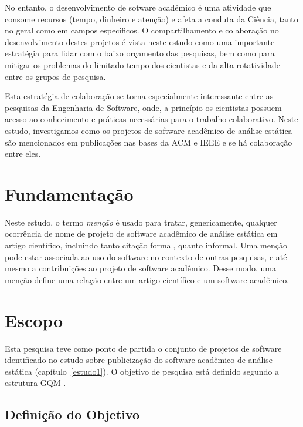 No entanto, o desenvolvimento de sotware acadêmico é uma atividade que consome recursos
(tempo, dinheiro e atenção) e afeta a conduta da Ciência, tanto no geral como
em campos específicos.
O compartilhamento e colaboração no desenvolvimento destes projetos é vista
neste estudo como uma importante estratégia para lidar com o baixo orçamento
das pesquisas, bem como para mitigar os problemas do limitado tempo dos
cientistas e da alta rotatividade entre os grupos de pesquisa.

Esta estratégia de colaboração se torna especialmente interessante entre as
pesquisas da Engenharia de Software, onde, a princípio os cientistas possuem
acesso ao conhecimento e práticas necessárias para o trabalho colaborativo.
Neste estudo, investigamos como os projetos de software acadêmico
de análise estática são mencionados em publicações nas bases da ACM e IEEE e se
há colaboração entre eles.


\section{Fundamentação} \label{estudo2:fundamentacao}

Neste estudo,
o termo \textit{menção} é usado para tratar, genericamente, qualquer ocorrência de
nome de projeto de software acadêmico de análise estática em artigo científico,
incluindo tanto citação formal, quanto informal.
Uma menção pode estar associada ao uso do software no contexto de outras pesquisas,
e até mesmo a contribuições ao projeto de software acadêmico.
Desse modo, uma menção define uma relação entre um artigo científico e 
um software acadêmico.


\section{Escopo} \label{estudo2:escopo} %

Esta pesquisa teve como ponto de partida
o conjunto de projetos de software identificado
no estudo sobre publicização do software acadêmico de análise estática (capítulo~\ref{estudo1}).
O objetivo de pesquisa está definido segundo a estrutura GQM \cite{basili1994goal}.

\subsection{Definição do Objetivo}

